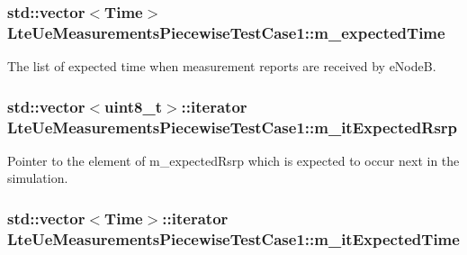 \subsubsection[{\texorpdfstring{m\+\_\+expected\+Time}{m_expectedTime}}]{\setlength{\rightskip}{0pt plus 5cm}std\+::vector$<${\bf Time}$>$ Lte\+Ue\+Measurements\+Piecewise\+Test\+Case1\+::m\+\_\+expected\+Time\hspace{0.3cm}{\ttfamily [private]}}\hypertarget{classLteUeMeasurementsPiecewiseTestCase1_a1906d2a638148579c52d6dcf370b84a2}{}\label{classLteUeMeasurementsPiecewiseTestCase1_a1906d2a638148579c52d6dcf370b84a2}


The list of expected time when measurement reports are received by e\+NodeB. 

\subsubsection[{\texorpdfstring{m\+\_\+it\+Expected\+Rsrp}{m_itExpectedRsrp}}]{\setlength{\rightskip}{0pt plus 5cm}std\+::vector$<$uint8\+\_\+t$>$\+::iterator Lte\+Ue\+Measurements\+Piecewise\+Test\+Case1\+::m\+\_\+it\+Expected\+Rsrp\hspace{0.3cm}{\ttfamily [private]}}\hypertarget{classLteUeMeasurementsPiecewiseTestCase1_ad0362797e90952c7ffd619a9aa59309b}{}\label{classLteUeMeasurementsPiecewiseTestCase1_ad0362797e90952c7ffd619a9aa59309b}


Pointer to the element of {\ttfamily m\+\_\+expected\+Rsrp} which is expected to occur next in the simulation. 

\subsubsection[{\texorpdfstring{m\+\_\+it\+Expected\+Time}{m_itExpectedTime}}]{\setlength{\rightskip}{0pt plus 5cm}std\+::vector$<${\bf Time}$>$\+::iterator Lte\+Ue\+Measurements\+Piecewise\+Test\+Case1\+::m\+\_\+it\+Expected\+Time\hspace{0.3cm}{\ttfamily [private]}}\hypertarget{classLteUeMeasurementsPiecewiseTestCase1_a6b6edd027bcc1219f66b88a318672dca}{}\label{classLteUeMeasurementsPiecewiseTestCase1_a6b6edd027bcc1219f66b88a318672dca}


